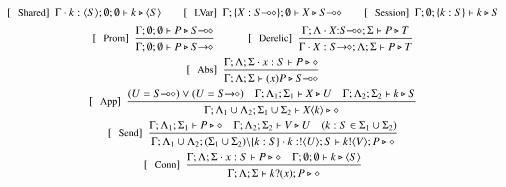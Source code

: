 \begin{figure}[!t]
\[
	\begin{array}{c}
		\trule{Shared}~~\Gamma \cat k : \chtype{S}; \emptyset; \emptyset \proves k \hastype \chtype{S}
		\qquad
		\trule{LVar}~~\Gamma; \set{X: \lhot{S}}; \emptyset \proves X \hastype \lhot{S} 
		\qquad 
		\trule{Session}~~\Gamma; \emptyset; \set{k:S} \proves k \hastype S 
		\\[2mm]

		\trule{Prom}~~\tree{
			\Gamma; \emptyset; \emptyset \proves P \hastype \lhot{S}
		}{
			\Gamma; \emptyset; \emptyset \proves P \hastype \shot{S}
		} 
		\qquad\quad  
		\trule{Derelic}~~\tree{
			\Gamma; \Lambda \cat X{:}\lhot{S}; \Sigma \proves P \hastype T
		}{
			\Gamma \cat X:\shot{S}; \Lambda; \Sigma \proves P \hastype T
		} 
		\\[4mm]

		\trule{Abs}~~\tree{
			\Gamma; \Lambda; \Sigma \cat x: S \proves P \hastype \Proc
		}{
			\Gamma; \Lambda; \Sigma \proves \abs{x}{P} \hastype \lhot{S}
		}
		\\[4mm]

		\trule{App}~~\tree{(U = \lhot{S}) \lor (U = \shot{S}) \quad \Gamma; \Lambda_1; \Sigma_1 \proves X \hastype U  \quad \Gamma; \Lambda_2; \Sigma_2 \proves k \hastype S
		}{
			\Gamma; \Lambda_1 \cup \Lambda_2; \Sigma_1 \cup \Sigma_2 \proves \appl{X}{k} \hastype \Proc
		} 
		\\[4mm]

		\trule{Send}~~\tree{
			\Gamma; \Lambda_1; \Sigma_1 \proves P \hastype \Proc  \quad \Gamma; \Lambda_2; \Sigma_2 \vdash V \hastype U  \quad (k:S \in \Sigma_1 \cup \Sigma_2)
		}{
			\Gamma; \Lambda_1 \cup \Lambda_2; (\Sigma_1 \cup \Sigma_2)\backslash\set{k:S} \cat k:\btout{U} S \proves \bout{k}{V} P \hastype \Proc
		}

		\\[4mm]
		\trule{Conn}~~\tree{
			\Gamma; \Lambda; \Sigma \cat x:S \proves P \hastype \Proc  \quad \Gamma; \emptyset; \emptyset \proves k \hastype \chtype{S}
		}{
			\Gamma; \Lambda; \Sigma \proves \binp{k}{x} P \hastype \Proc
		}
		\\[4mm]


\end{array}\]
\end{figure}
